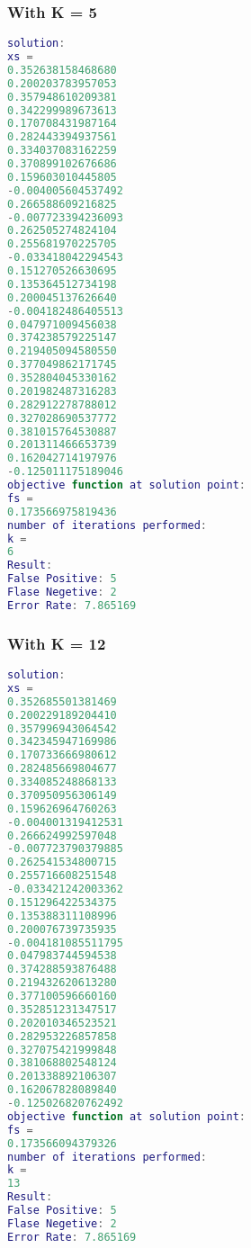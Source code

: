 \subsubsection{With K = 5}
\label{subsubsect:5_iteration}
\begin{lstlisting}[language=Matlab]
solution:
xs =
0.352638158468680
0.200203783957053
0.357948610209381
0.342299989673613
0.170708431987164
0.282443394937561
0.334037083162259
0.370899102676686
0.159603010445805
-0.004005604537492
0.266588609216825
-0.007723394236093
0.262505274824104
0.255681970225705
-0.033418042294543
0.151270526630695
0.135364512734198
0.200045137626640
-0.004182486405513
0.047971009456038
0.374238579225147
0.219405094580550
0.377049862171745
0.352804045330162
0.201982487316283
0.282912278788012
0.327028690537772
0.381015764530887
0.201311466653739
0.162042714197976
-0.125011175189046
objective function at solution point:
fs =
0.173566975819436
number of iterations performed:
k =
6
Result:
False Positive: 5
Flase Negetive: 2
Error Rate: 7.865169
\end{lstlisting}

\subsubsection{With K = 12}
\label{subsubsect:12_iterations}
\begin{lstlisting}[language=Matlab]
solution:
xs =
0.352685501381469
0.200229189204410
0.357996943064542
0.342345947169986
0.170733666980612
0.282485669804677
0.334085248868133
0.370950956306149
0.159626964760263
-0.004001319412531
0.266624992597048
-0.007723790379885
0.262541534800715
0.255716608251548
-0.033421242003362
0.151296422534375
0.135388311108996
0.200076739735935
-0.004181085511795
0.047983744594538
0.374288593876488
0.219432620613280
0.377100596660160
0.352851231347517
0.202010346523521
0.282953226857858
0.327075421999848
0.381068802548124
0.201338892106307
0.162067828089840
-0.125026820762492
objective function at solution point:
fs =
0.173566094379326
number of iterations performed:
k =
13
Result:
False Positive: 5
Flase Negetive: 2
Error Rate: 7.865169
\end{lstlisting}

